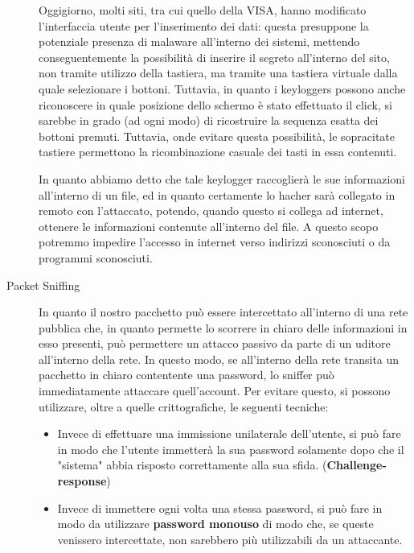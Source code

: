 \begin{description}
	Oggigiorno, molti siti, tra cui quello della VISA, hanno modificato
	l'interfaccia utente per l'inserimento dei dati: questa presuppone
	la potenziale presenza di malaware all'interno dei sistemi, mettendo
	conseguentemente la possibilità di inserire il segreto all'interno
	del sito, non tramite utilizzo della tastiera, ma tramite una tastiera
	virtuale dalla quale selezionare i bottoni. Tuttavia, in quanto i 
	keyloggers possono anche riconoscere in quale posizione dello schermo
	è stato effettuato il click, si sarebbe in grado (ad ogni modo) di
	ricostruire la sequenza esatta dei bottoni premuti. Tuttavia, onde evitare
	questa possibilità, le sopracitate tastiere permettono la ricombinazione
	casuale dei tasti in essa contenuti.
	
	In quanto abbiamo detto che tale keylogger raccoglierà le sue informazioni
	all'interno di un file, ed in quanto certamente lo hacher sarà collegato
	in remoto con l'attaccato, potendo, quando questo si collega ad 
	internet, ottenere le informazioni contenute all'interno del file.
	A questo scopo potremmo impedire l'accesso in internet verso indirizzi
	sconosciuti o da programmi sconosciuti.
\item[Packet Sniffing] In quanto il nostro pacchetto può essere intercettato
	all'interno di una rete pubblica che, in quanto permette lo scorrere
	in chiaro delle informazioni in esso presenti, può permettere un
	attacco passivo da parte di un uditore all'interno della rete. In questo
	modo, se all'interno della rete transita un pacchetto in chiaro
	contentente una password, lo sniffer può immediatamente attaccare quell'account.
	Per evitare questo, si possono utilizzare, oltre a quelle crittografiche,
	le seguenti tecniche:
	\begin{itemize}
	\item Invece di effettuare una immissione unilaterale dell'utente,
	si può fare in modo che l'utente immetterà la sua password solamente
	dopo che il "sistema" abbia risposto correttamente alla sua sfida.
	(\textbf{Challenge-response})
	\item Invece di immettere ogni volta una stessa password, si può fare 
	in modo da utilizzare \textbf{password monouso} di modo che, se queste
	venissero intercettate, non sarebbero più utilizzabili da un attaccante.
	\end{itemize}
\end{description}


